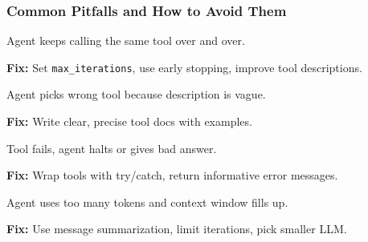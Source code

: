 \documentclass[aspectratio=169,11pt]{beamer}
\begin{document}
\begin{frame}
\frametitle{Common Pitfalls and How to Avoid Them}

\begin{warningbox}
Agent keeps calling the same tool over and over.

\textbf{Fix:} Set \texttt{max\_iterations}, use early stopping, improve tool descriptions.
\end{warningbox}

\begin{warningbox}
Agent picks wrong tool because description is vague.

\textbf{Fix:} Write clear, precise tool docs with examples.
\end{warningbox}

\begin{warningbox}
Tool fails, agent halts or gives bad answer.

\textbf{Fix:} Wrap tools with try/catch, return informative error messages.
\end{warningbox}

\begin{warningbox}
Agent uses too many tokens and context window fills up.

\textbf{Fix:} Use message summarization, limit iterations, pick smaller LLM.
\end{warningbox}

\end{frame}
\end{document}
